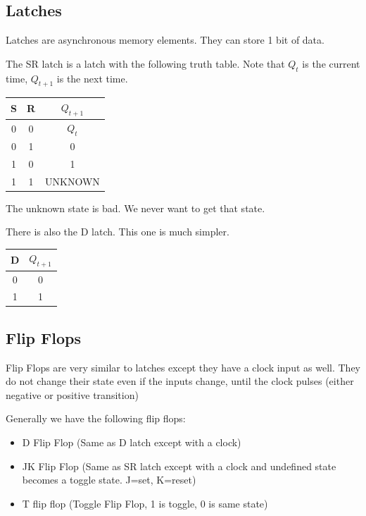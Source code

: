 \documentclass[12pt,letterpaper]{article} \usepackage{amsmath} \usepackage{graphicx}  \usepackage{longtable}  \usepackage{amssymb}
\begin{document}
        \subsection{Latches}
        Latches are asynchronous memory elements. They can store 1 bit of data. 

        The SR latch is a latch with the following truth table. Note that $Q_t$ is the current time, $Q_{t+1}$ is the next time. 
        \begin{center}
            \begin{tabular}{ c | c | c}
                S & R & $Q_{t+1}$ \\
                \hline
                0&0&$Q_t$\\
                0&1&0\\
                1&0&1\\
                1&1&UNKNOWN
            \end{tabular}        
        \end{center}
        The unknown state is bad. We never want to get that state. 

        There is also the D latch. This one is much simpler.
        \begin{center}
            \begin{tabular}{ c | c }
                D&$Q_{t+1}$\\
                \hline
                0&0\\
                1&1
            \end{tabular}        
        \end{center}

        \subsection{Flip Flops}
        Flip Flops are very similar to latches except they have a clock input as well. They do not change their state even if the inputs change, until the clock pulses (either negative or positive transition)

        Generally we have the following flip flops:
        \begin{itemize}[noitemsep]
            \item D Flip Flop (Same as D latch except with a clock)
            \item JK Flip Flop (Same as SR latch except with a clock and undefined state becomes a toggle state. J=set, K=reset)
            \item T flip flop (Toggle Flip Flop, 1 is toggle, 0 is same state)
        \end{itemize}
\end{document}

